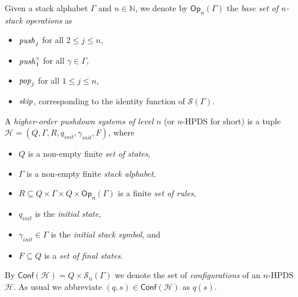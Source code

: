 \documentclass[a4paper,UKenglish,cleveref, autoref, thm-restate]{lipics-v2021}
\renewcommand{\H}{\mathcal{H}}
\newcommand{\N}{\mathbb{N}}
\newcommand{\Conf}{\mathsf{Conf}}
\newcommand{\Op}{\mathsf{Op}}
\begin{document}
Given a stack alphabet $\Gamma$ and $n \in \N$, 
we denote by  $\Op_n(\Gamma)$ the {\em base set of $n$-stack operations} as

\begin{itemize}
\item $\text{\textit{push}}_j$ for all $2 \leq j \leq n$,

\item $\text{\textit{push}}_1^\gamma$ for all $\gamma \in \Gamma$,

\item $\text{\textit{pop}}_j$ for all $1 \leq j \leq n$,

\item $\text{\textit{skip}}$, corresponding to the identity function of $\mathscr{S}(\Gamma)$.

\end{itemize}




\begin{samepage}
\par\noindent\ignorespacesafterend
A {\em higher-order pushdown systems of level $n$} (or $n$-HPDS for short) 
is a tuple $\H=(Q, \Gamma, R, q_{init}, \gamma_{init}, F)$,
where 
\begin{itemize}
        \item $Q$ is a non-empty finite {\em set of  states},
        \item $\Gamma$ is a non-empty finite {\em  stack alphabet},
	\item $R\subseteq Q\times \Gamma \times Q \times \Op_n(\Gamma)$ is a finite {\em set of  rules},
        \item $q_{init}$ is the {\em initial  state},
        \item $\gamma_{init} \in \Gamma$ is the {\em %
initial stack symbol}, and
	\item $F\subseteq Q$ is a {\em set of final  states}.
		\end{itemize}
\end{samepage}

\par\noindent\ignorespacesafterend
By $\Conf(\mathcal{H}) = Q \times \mathscr{S}_n(\Gamma)$
we denote the set of {\em configurations} of an $n$-HPDS $\H$. 
As usual we abbreviate $(q,s) \in \Conf(\mathcal{H})$ as $q(s)$.
\end{document}
